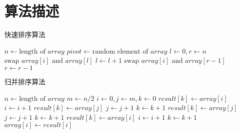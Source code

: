 \section{算法描述}

\begin{algorithm}
  \caption{快速排序算法}
  \begin{algorithmic}[1]
    \State $n \gets \text{length of } array$
    \State $pivot \gets \text{random element of } array$
     \Return
    \EndIf
    \State $l \gets 0, r \gets n$
        \State $\text{swap } array[i] \text{ and } array[l]$
        \State $l \gets l + 1$
      \EndIf
    \EndFor
        \State $\text{swap } array[i] \text{ and } array[r - 1]$
        \State $r \gets r - 1$
      \EndIf
    \EndFor
    \State {}
    \State {}
  \EndProcedure
  \end{algorithmic}
\end{algorithm}

\begin{algorithm}
  \caption{归并排序算法}
  \begin{algorithmic}[1]
    \State $n \gets \text{length of } array$
     \Return
    \EndIf
    \State $m \gets n / 2$
    \State {}
    \State {}
    \State $i \gets 0, j \gets m, k \gets 0$
        \State $result[k] \gets array[i]$
        \State $i \gets i + 1$
      \Else
        \State $result[k] \gets array[j]$
        \State $j \gets j + 1$
      \EndIf
      \State $k \gets k + 1$
    \EndWhile
      \State $result[k] \gets array[j]$
      \State $j \gets j + 1$
      \State $k \gets k + 1$
    \EndWhile
      \State $result[k] \gets array[i]$
      \State $i \gets i + 1$
      \State $k \gets k + 1$
    \EndWhile
      \State $array[i] \gets result[i]$
    \EndFor
  \EndProcedure
  \end{algorithmic}
\end{algorithm}
